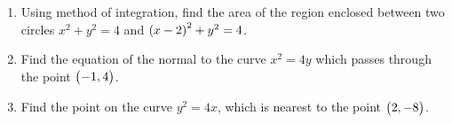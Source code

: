 \begin{enumerate}
\item Using method of integration, find the area of the region enclosed between two circles ${x^2+y^2=4}$ and $\left(x-2\right)^2+{y^2}=4$.

\item Find the equation of the normal to the curve ${x}^2 = 4y$ which passes through the point $\begin{pmatrix}-1,4\end{pmatrix}$.

\item Find the point on the curve ${y}^2 = 4x$, which is nearest to the point $\begin{pmatrix}2,-8\end{pmatrix}$.
\end{enumerate} 
